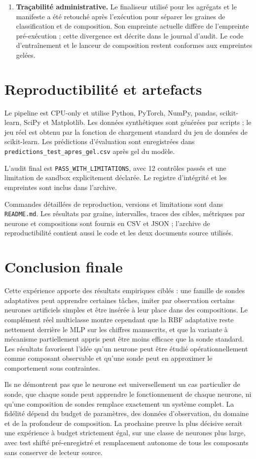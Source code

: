 \documentclass[11pt,a4paper]{article}
\begin{document}
\begin{enumerate}[leftmargin=1.15cm]
\item \textbf{Traçabilité administrative.} Le finaliseur utilisé pour les agrégats et le manifeste a été retouché après l'exécution pour séparer les graines de classification et de composition. Son empreinte actuelle diffère de l'empreinte pré-exécution ; cette divergence est décrite dans le journal d'audit. Le code d'entraînement et le lanceur de composition restent conformes aux empreintes gelées.
\end{enumerate}

\section{Reproductibilité et artefacts}
Le pipeline est CPU-only et utilise Python, PyTorch, NumPy, pandas, scikit-learn, SciPy et Matplotlib. Les données synthétiques sont générées par scripts ; le jeu réel est obtenu par la fonction de chargement standard du jeu de données de scikit-learn. Les prédictions d'évaluation sont enregistrées dans \texttt{predictions\_test\_apres\_gel.csv} après gel du modèle.

L'audit final est \texttt{PASS\_WITH\_LIMITATIONS}, avec 12 contrôles passés et une limitation de sandbox explicitement déclarée. Le registre d'intégrité et les empreintes sont inclus dans l'archive.

Commandes détaillées de reproduction, versions et limitations sont dans \texttt{README.md}. Les résultats par graine, intervalles, traces des cibles, métriques par neurone et compositions sont fournis en CSV et JSON ; l'archive de reproductibilité contient aussi le code et les deux documents source utilisés.

\section{Conclusion finale}
Cette expérience apporte des résultats empiriques ciblés : une famille de sondes adaptatives peut apprendre certaines tâches, imiter par observation certains neurones artificiels simples et être insérée à leur place dans des compositions. Le complément réel multiclasse montre cependant que la RBF adaptative reste nettement derrière le MLP sur les chiffres manuscrits, et que la variante à mécanisme partiellement appris peut être moins efficace que la sonde standard. Les résultats favorisent l'idée qu'un neurone peut être étudié opérationnellement comme composant observable et qu'une sonde peut en approximer le comportement sous contraintes.

Ils ne démontrent pas que le neurone est universellement un cas particulier de sonde, que chaque sonde peut apprendre le fonctionnement de chaque neurone, ni qu'une composition de sondes remplace exactement un système complet. La fidélité dépend du budget de paramètres, des données d'observation, du domaine et de la profondeur de composition. La prochaine preuve la plus décisive serait une expérience à budget strictement égal, sur une classe de neurones plus large, avec test shifté pré-enregistré et remplacement autonome de tous les composants sans conserver de lecteur source.
\end{document}
